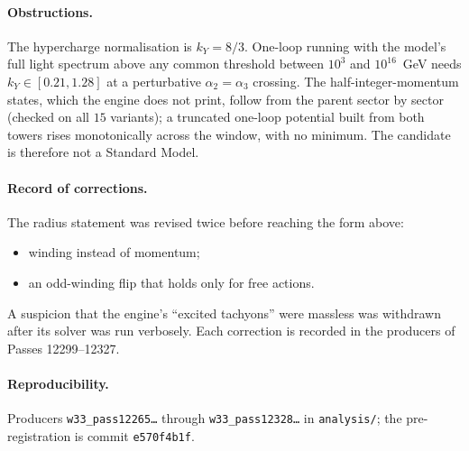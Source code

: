 \documentclass[11pt]{article}
\begin{document}
\paragraph{Obstructions.} The hypercharge normalisation is $k_Y=8/3$. One-loop running with the model's full light spectrum above any
common threshold between $10^3$ and $10^{16}$~GeV needs $k_Y\in[0.21,1.28]$ at a perturbative $\alpha_2=\alpha_3$ crossing. The half-integer-momentum states, which the engine does not print, follow from the parent sector by sector (checked on all
$15$ variants); a truncated one-loop potential built from both towers rises monotonically across the window, with no minimum. The candidate is therefore not a Standard Model.

\paragraph{Record of corrections.} The radius statement was revised twice before reaching the form above:
\begin{itemize}
\item winding instead of momentum;
\item an odd-winding flip that holds only for free actions.
\end{itemize}
A suspicion that the engine's ``excited tachyons'' were massless was withdrawn after its solver was run verbosely. Each correction is
recorded in the producers of Passes 12299--12327.

\paragraph{Reproducibility.} Producers \texttt{w33\_pass12265\ldots} through \texttt{w33\_pass12328\ldots} in \texttt{analysis/}; the
pre-registration is commit \texttt{e570f4b1f}.
\end{document}
